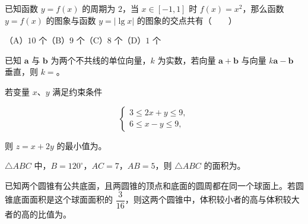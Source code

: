 \begin{question}
已知函数 $y=f(x)$ 的周期为 $2$，当 $x\in[-1,1]$ 时 $f(x)=x^2$，那么函数 $y=f(x)$ 的图象与函数 $y=|\lg x|$ 的图象的交点共有\mbox{（　　）}

（A）$10$ 个\quad（B）$9$ 个\quad（C）$8$ 个\quad（D）$1$ 个

\end{question}

\begin{question}
已知 $\boldsymbol a$ 与 $\boldsymbol b$ 为两个不共线的单位向量，$k$ 为实数，若向量 $\boldsymbol a+\boldsymbol b$ 与向量 $k\boldsymbol a-\boldsymbol b$ 垂直，则 $k=$\gkblank{}。

\end{question}
\begin{question}
若变量 $x\text{、}y$ 满足约束条件

\nopagebreak[4]
\[
\begin{cases}
3\leq2x+y\leq9,\\
6\leq x-y\leq9,
\end{cases}
\]

则 $z=x+2y$ 的最小值为\gkblank{}。

\end{question}
\begin{question}
$\triangle ABC$ 中，$B=120^\circ$，$AC=7$，$AB=5$，则 $\triangle ABC$ 的面积为\gkblank{}。

\end{question}
\begin{question}
已知两个圆锥有公共底面，且两圆锥的顶点和底面的圆周都在同一个球面上。若圆锥底面面积是这个球面面积的 $\dfrac3{16}$，则这两个圆锥中，体积较小者的高与体积较大者的高的比值为\gkblank{}。

\end{question}

